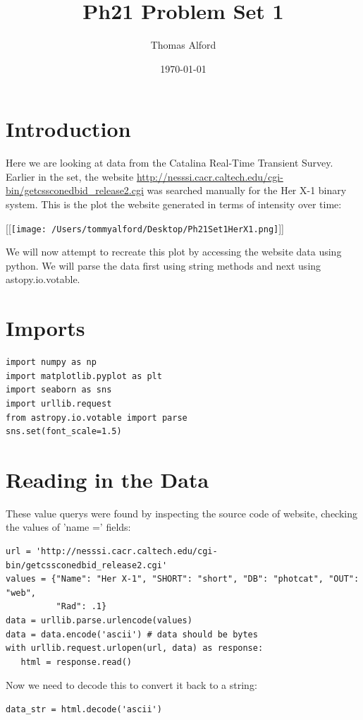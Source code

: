 \documentclass[11pt]{article}
\author{Thomas Alford}
\date{\today}
\title{Ph21 Problem Set 1}
\begin{document}
\maketitle

\section*{Introduction}
\label{sec-1}

Here we are looking at data from the Catalina Real-Time Transient
Survey. Earlier in the set, the website
\url{http://nesssi.cacr.caltech.edu/cgi-bin/getcssconedbid_release2.cgi} was searched
manually for the Her X-1 binary system. This is the plot the website generated
in terms of intensity over time:

[[\texttt{[image: /Users/tommyalford/Desktop/Ph21Set1HerX1.png]}]]


We will now attempt to recreate this plot by accessing the website data using
python. We will parse the data first using string methods and next using
astopy.io.votable.

\section*{Imports}
\label{sec-2}
\begin{verbatim}
import numpy as np
import matplotlib.pyplot as plt
import seaborn as sns
import urllib.request
from astropy.io.votable import parse
sns.set(font_scale=1.5)
\end{verbatim}

\section*{Reading in the Data}
\label{sec-3}
These value querys were found by inspecting the source code of website,
checking the values of 'name =' fields:

\begin{verbatim}
url = 'http://nesssi.cacr.caltech.edu/cgi-bin/getcssconedbid_release2.cgi'
values = {"Name": "Her X-1", "SHORT": "short", "DB": "photcat", "OUT": "web",
          "Rad": .1}
data = urllib.parse.urlencode(values)
data = data.encode('ascii') # data should be bytes
with urllib.request.urlopen(url, data) as response:
   html = response.read()
\end{verbatim}


Now we need to decode this to convert it back to a string:
\begin{verbatim}
data_str = html.decode('ascii')
\end{verbatim}
\end{document}
